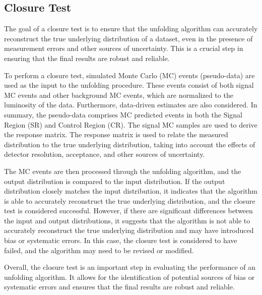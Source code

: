 \subsection{Closure Test}
\label{sec:closure_test}

The goal of a closure test is to ensure that the unfolding algorithm can accurately reconstruct the true underlying distribution of a dataset, even in the presence of measurement errors and other sources of uncertainty. This is a crucial step in ensuring that the final results are robust and reliable.

To perform a closure test, simulated Monte Carlo (MC) events (pseudo-data) are used as the input to the unfolding procedure. These events consist of both signal MC events and other background MC events, which are normalized to the luminosity of the data. Furthermore, data-driven estimates are also considered. In summary, the pseudo-data comprises MC predicted events in both the Signal Region (SR) and Control Region (CR). The signal MC samples are used to derive the response matrix. The response matrix is used to relate the measured distribution to the true underlying distribution, 
taking into account the effects of detector resolution, acceptance, and other sources of uncertainty.

The MC events are then processed through the unfolding algorithm, and the output distribution is compared to the input distribution. If the output distribution closely matches the input distribution, it indicates that the algorithm is able to accurately reconstruct the true underlying distribution, and the closure test is considered successful. However, if there are significant differences between the input and output distributions, it suggests that the algorithm is not able to accurately reconstruct the true underlying distribution and may have introduced bias or systematic errors. In this case, the closure test is considered to have failed, and the algorithm may need to be revised or modified.

Overall, the closure test is an important step in evaluating the performance of an unfolding algorithm. It allows for the identification of potential sources of bias or systematic errors and ensures that the final results are robust and reliable.


